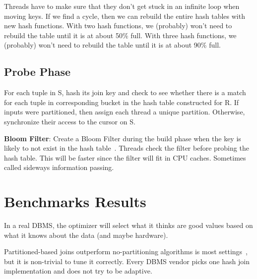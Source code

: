 \documentclass[11pt]{article}
\begin{document}
\begin{itemize}
\begin{itemize}
		Threads have to make sure that they don’t get stuck in an infinite loop when moving keys.
		If we find a cycle, then we can rebuild the entire hash tables with new hash functions.
		With two hash functions, we (probably) won’t need to rebuild the table until it is at about 50\% full.
		With three hash functions, we (probably) won’t need to rebuild the table until it is at about 90\% full.
	\end{itemize}
\end{itemize}

\subsection*{Probe Phase}
For each tuple in S, hash its join key and check to see whether there is a match for each tuple in corresponding bucket in the hash table constructed for R. If inputs were partitioned, then assign each thread a unique partition. Otherwise, synchronize their access to the cursor on S.

\textbf{Bloom Filter}: Create a Bloom Filter during the build phase when the key is likely to not exist in the hash table~\cite{Ducanu2013}. Threads check the filter before probing the hash table. This will be faster since the filter will fit in CPU caches. Sometimes called sideways information passing.


\section{Benchmarks Results}
In a real DBMS, the optimizer will select what it thinks are good values based on what it knows about the data (and maybe hardware).

Partitioned-based joins outperform no-partitioning algorithms is most settings~\cite{Blanas2011}, but it is non-trivial to tune it correctly. Every DBMS vendor picks one hash join implementation and does not try to be adaptive.


\newpage


\end{document}
